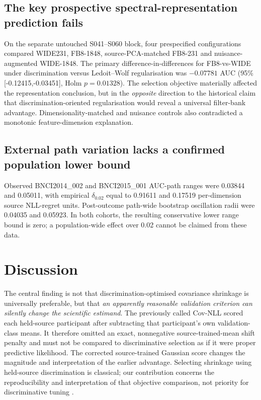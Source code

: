 \documentclass[11pt,a4paper]{article}
\begin{document}







\subsection{The key prospective spectral-representation prediction fails}
On the separate untouched S041--S060 block, four prespecified
configurations compared WIDE231, FB8-1848, source-PCA-matched
FB8-231 and nuisance-augmented WIDE-1848. The primary
difference-in-differences for FB8-vs-WIDE under discrimination versus
Ledoit--Wolf regularisation was \(-0.07781\) AUC
(95\% [-0.12415,-0.03451], Holm \(p=0.01328\)).
The selection objective materially affected the representation
conclusion, but in the \emph{opposite} direction to the historical
claim that discrimination-oriented regularisation would reveal a
universal filter-bank advantage. Dimensionality-matched and nuisance
controls also contradicted a monotonic feature-dimension explanation.

\subsection{External path variation lacks a confirmed population lower bound}
Observed BNCI2014\_002 and BNCI2015\_001 AUC-path ranges were
0.03844 and 0.05011, with empirical \(\delta_{0.02}\) equal
to 0.91611 and 0.17519 per-dimension source NLL-regret units.
Post-outcome path-wide bootstrap oscillation radii were 0.04035
and 0.05923. In both cohorts, the resulting conservative
lower range bound is zero; a population-wide effect over 0.02
cannot be claimed from these data.







\section{Discussion}
The central finding is not that discrimination-optimised covariance
shrinkage is universally preferable, but that \emph{an apparently
reasonable validation criterion can silently change the scientific
estimand}. The previously called Cov-NLL scored each held-source
participant after subtracting that participant's own validation-class
means. It therefore omitted an exact, nonnegative source-trained-mean
shift penalty and must not be compared to discriminative selection
as if it were proper predictive likelihood. The corrected source-trained
Gaussian score changes the magnitude and interpretation of the earlier
advantage. Selecting shrinkage using held-source discrimination is
classical; our contribution concerns the reproducibility and
interpretation of that objective comparison, not priority for
discriminative tuning \cite{friedman1989,tomioka2010regularized}.
\end{document}
